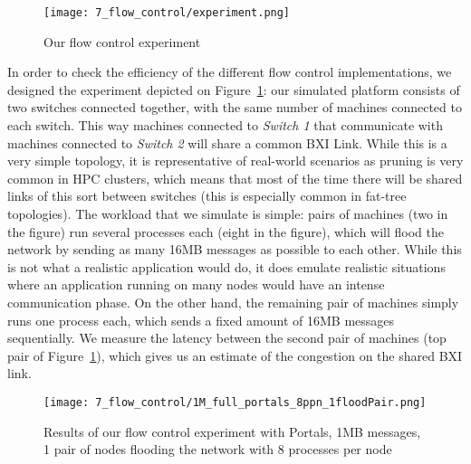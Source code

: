 \begin{figure}[!ht]
    \centering
    \texttt{[image: 7\_flow\_control/experiment.png]}
    \caption{Our flow control experiment}
    \label{fig:7_flow_control:experiment}
\end{figure}

In order to check the efficiency of the different flow control implementations,
we designed the experiment depicted on
Figure~\ref{fig:7_flow_control:experiment}: our simulated platform consists of
two switches connected together, with the same number of machines connected to
each switch. This way machines connected to \textit{Switch 1} that communicate
with machines connected to \textit{Switch 2} will share a common BXI Link. While
this is a very simple topology, it is representative of real-world scenarios as
pruning is very common in HPC clusters, which means that most of the time there
will be shared links of this sort between switches (this is especially common in
fat-tree topologies). The workload that we simulate is simple: pairs of machines
(two in the figure) run several processes each (eight in the figure), which will
flood the network by sending as many 16MB messages as possible to each other.
While this is not what a realistic application would do, it does emulate
realistic situations where an application running on many nodes would have an
intense communication phase. On the other hand, the remaining pair of machines
simply runs one process each, which sends a fixed amount of 16MB messages
sequentially. We measure the latency between the second pair of machines (top
pair of Figure~\ref{fig:7_flow_control:experiment}), which gives us an estimate
of the congestion on the shared BXI link.

\begin{figure}[!ht]
    \centering
    \texttt{[image: 7\_flow\_control/1M\_full\_portals\_8ppn\_1floodPair.png]}
    \caption{Results of our flow control experiment with Portals, 1MB messages, 1 pair of nodes flooding the network with 8 processes per node}
    \label{fig:7_flow_control:1M_full_portals_8ppn_1floodPair}
\end{figure}

